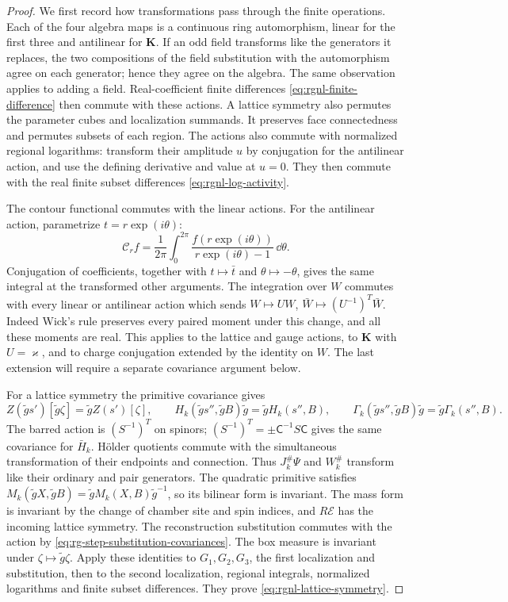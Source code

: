 \begin{proof}
We first record how transformations pass through the
finite operations. Each of the four algebra maps is a
continuous ring automorphism, linear for the first three
and antilinear for $\mathbf K$. If an odd field transforms
like the generators it replaces, the two compositions of
the field substitution with the automorphism agree on
each generator; hence they agree on the algebra.
The same observation applies to adding a field.
Real-coefficient finite differences
\eqref{eq:rgnl-finite-difference} then commute with these
actions. A lattice symmetry also permutes the parameter
cubes and localization summands. It preserves face
connectedness and permutes subsets of each region.
The actions also commute with normalized regional logarithms:
transform their amplitude $u$ by conjugation for the antilinear
action, and use the defining derivative and value at $u=0$.
They then commute with the real finite subset differences
\eqref{eq:rgnl-log-activity}.

The contour functional commutes with the linear actions.
For the antilinear action, parametrize $t=r\exp(i\theta)$:
\[
 \mathcal C_rf=\frac1{2\pi}\int_0^{2\pi}
             \frac{f(r\exp(i\theta))}{r\exp(i\theta)-1}\,\dd\theta.
\]
Conjugation of coefficients, together with
$t\mapsto\bar t$ and $\theta\mapsto-\theta$, gives the
same integral at the transformed other arguments.
The integration over $W$ commutes with every linear or
antilinear action which sends
$W\mapsto UW$, $\bar W\mapsto(U^{-1})^T\bar W$.
Indeed Wick's rule preserves every paired moment under
this change, and all these moments are real.
This applies to the lattice and gauge actions, to
$\mathbf K$ with $U=\varkappa$, and to charge conjugation
extended by the identity on $W$.
The last extension will require a separate covariance
argument below.

For a lattice symmetry the primitive covariance gives
\[
 Z(\tilde gs')[\tilde g\zeta]=\tilde gZ(s')[\zeta],\qquad
 H_k(\tilde gs'',\tilde gB)\tilde g=\tilde gH_k(s'',B),
 \qquad
 \Gamma_k(\tilde gs'',\tilde gB)\tilde g=\tilde g\Gamma_k(s'',B).
\]
The barred action is $(S^{-1})^T$ on spinors;
$(S^{-1})^T=\pm\mathsf C^{-1}S\mathsf C$ gives the
same covariance for $\bar H_k$.
H\"older quotients commute with the simultaneous
transformation of their endpoints and connection.
Thus $J_k^\#\Psi$ and $W_k^\#$ transform like their
ordinary and pair generators.
The quadratic primitive satisfies
$M_k(\tilde gX,\tilde gB)=\tilde gM_k(X,B)\tilde g^{-1}$,
so its bilinear form is invariant.
The mass form is invariant by the change of chamber
site and spin indices, and $R\mathscr E$ has the
incoming lattice symmetry. The reconstruction substitution
commutes with the action by
\eqref{eq:rg-step-substitution-covariances}.
The box measure is invariant under $\zeta\mapsto\tilde g\zeta$.
Apply these identities to $G_1,G_2,G_3$, the first
localization and substitution, then to the second
localization, regional integrals, normalized logarithms and finite
subset differences.
They prove \eqref{eq:rgnl-lattice-symmetry}.


\end{proof}
